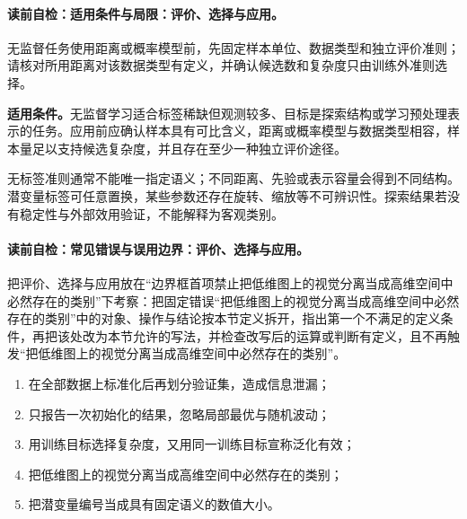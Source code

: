 \label{struct:V4-C01-CH28}
\paragraph{读前自检：适用条件与局限：评价、选择与应用。}无监督任务使用距离或概率模型前，先固定样本单位、数据类型和独立评价准则；请核对所用距离对该数据类型有定义，并确认候选数和复杂度只由训练外准则选择。\par

\begin{applicabilitybox}
\textbf{适用条件。}无监督学习适合标签稀缺但观测较多、目标是探索结构或学习预处理表示的任务。应用前应确认样本具有可比含义，距离或概率模型与数据类型相容，样本量足以支持候选复杂度，并且存在至少一种独立评价途径。
\end{applicabilitybox}

\label{struct:V4-C01-CH29}
\begin{notapplicablebox}[title=\SLMethodLimitationsTitle]
无标签准则通常不能唯一指定语义；不同距离、先验或表示容量会得到不同结构。潜变量标签可任意置换，某些参数还存在旋转、缩放等不可辨识性。探索结果若没有稳定性与外部效用验证，不能解释为客观类别。
\end{notapplicablebox}

\label{struct:V4-C01-CH30}
\paragraph{读前自检：常见错误与误用边界：评价、选择与应用。}把评价、选择与应用放在“边界框首项禁止把低维图上的视觉分离当成高维空间中必然存在的类别”下考察：把固定错误“把低维图上的视觉分离当成高维空间中必然存在的类别”中的对象、操作与结论按本节定义拆开，指出第一个不满足的定义条件，再把该处改为本节允许的写法，并检查改写后的运算或判断有定义，且不再触发“把低维图上的视觉分离当成高维空间中必然存在的类别”。\par

\begin{warningbox}
\begin{enumerate}[leftmargin=2.2em]
  \item 在全部数据上标准化后再划分验证集，造成信息泄漏；
  \item 只报告一次初始化的结果，忽略局部最优与随机波动；
  \item 用训练目标选择复杂度，又用同一训练目标宣称泛化有效；
  \item 把低维图上的视觉分离当成高维空间中必然存在的类别；
  \item 把潜变量编号当成具有固定语义的数值大小。
\end{enumerate}
\end{warningbox}

